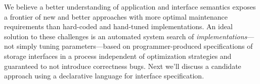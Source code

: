 We believe a better understanding of application and interface
semantics exposes a frontier of new and better approaches with more optimal maintenance requirements
than hard-coded and hand-tuned implementations. An ideal solution to these challenges is an automated system
search of \emph{implementations}---not simply tuning parameters---based on
programmer-produced specifications of storage interfaces in a process
independent of optimization strategies and guaranteed to not introduce
correctness bugs. Next we'll discuss a candidate approach using a declarative
language for interface specification.
